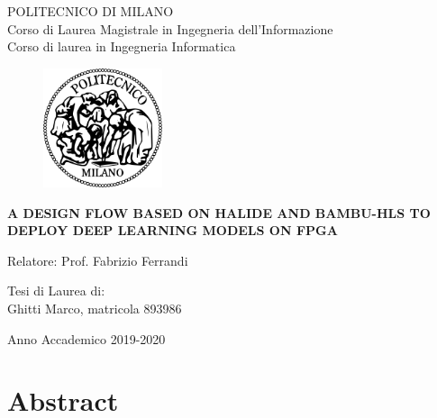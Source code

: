\documentclass[11pt, a4paper, twoside, openright]{report}
\begin{document}
\thispagestyle{empty}
\setlength{\parskip}{1em}
{\bfseries
\begin{center}

\large
POLITECNICO DI MILANO\\
\normalsize
Corso di Laurea Magistrale in Ingegneria dell’Informazione \\
Corso di laurea in Ingegneria Informatica \par
  
\vspace{3em}
  
  \begin{figure}[htbp]
    \begin{center}
      \includegraphics[width=3.5cm]{logopm.png}
    \end{center}
  \end{figure}
  \vspace*{0.3cm} \Large
  \textbf{A DESIGN FLOW BASED ON HALIDE AND BAMBU-HLS TO DEPLOY DEEP LEARNING MODELS ON FPGA}\\

\end{center}
\vspace*{3.0cm} \large
\begin{flushleft}

  Relatore: Prof. Fabrizio Ferrandi

\end{flushleft}
\vspace*{1cm}
\begin{flushright}

  Tesi di Laurea di:\\ Ghitti Marco, matricola 893986
\end{flushright}
\vspace*{1cm}
\begin{center}

  Anno Accademico 2019-2020
\end{center} \clearpage
}

\thispagestyle{empty}
\null
\newpage

\chapter*{Abstract}
\end{document}
